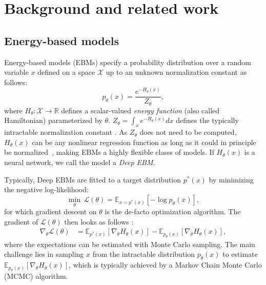 \section{Background and related work}
\label{sec:related-work}

\subsection{Energy-based models}\label{sec:ebms}
Energy-based models (EBMs) specify 
a probability distribution over a random variable $x$ defined on a space $\mathcal{X}$ up to an unknown normalization constant as follows:
\begin{equation}
    p_\theta(x) = \frac{e^{-H_\theta(x)}}{Z_\theta},
\end{equation}
where $H_\theta: \mathcal{X} \rightarrow \mathbb{R}$ defines a scalar-valued \emph{energy function} (also called Hamiltonian) parameterized by $\theta$. $Z_\theta = \int_x e^{-H_\theta(x)} dx$ defines the typically intractable normalization constant \cite{lecun2006tutorial, kingma2021ebm}. 
As $Z_\theta$ does not need to be computed, $H_\theta(x)$ can be any nonlinear regression function as long as it could in principle be normalized~\cite{kingma2021ebm}, making EBMs a highly flexible classs of models. If $H_\theta(x)$ is a neural network, we call the model a \textit{Deep EBM}.

Typically, Deep EBMs are fitted to a target distribution $p^*(x)$ by minimizing the negative log-likelihood:
\begin{equation}\label{eq:maxlikelihoodebm}
    \underset{\theta}{\min} \, \mathcal{L}(\theta) = \mathbb{E}_{x\sim p^*(x)}[-\log p_\theta(x)],
\end{equation}
for which gradient descent on $\theta$ is the de-facto optimization algorithm. The gradient of $\mathcal{L}(\theta)$ then looks as follows \cite{hinton2002training, kingma2021ebm}:
\begin{align}\label{eq:gradientebm}
    \nabla_\theta \mathcal{L}(\theta) &= \mathbb{E}_{p^*(x)}[\nabla_\theta H_\theta(x)] - \mathbb{E}_{p_\theta(x)}[\nabla_\theta H_\theta(x)],
\end{align}
where the expectations can be estimated with Monte Carlo sampling.
The main challenge lies in sampling $x$ from the intractable distribution $p_\theta(x)$ to estimate $\mathbb{E}_{p_\theta(x)}[\nabla_\theta H_\theta(x)]$, which is typically achieved by 
a Markov Chain Monte Carlo (MCMC) algorithm.






